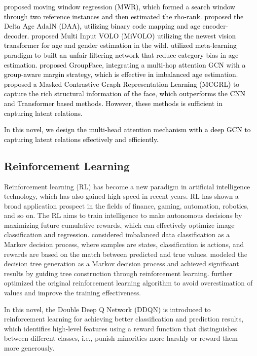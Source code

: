 \textcolor{black}{
\citet{shin2022moving} proposed moving window regression (MWR), which formed a search window through two reference instances and then estimated the rho-rank. \citet{chen2023daa} proposed the Delta Age AdaIN (DAA), utilizing binary code mapping and age encoder-decoder.  \citet{kuprashevich2023mivolo} proposed Multi Input VOLO (MiVOLO) utilizing the newest vision transformer for age and gender estimation in the wild. \citet{wang2023exploiting} utilized meta-learning paradigm to built an unfair filtering network that reduce category bias in age estimation. \citet{zhang2024groupface} proposed GroupFace, integrating a multi-hop attention GCN with a group-aware margin strategy, which is effective in imbalanced age estimation. \citet{shou2025masked} proposed a Masked Contrastive Graph Representation Learning (MCGRL) to capture the rich structural information of the face, which outperforms the CNN and Transformer based methods. However, these methods is sufficient in capturing latent relations.
}

\textcolor{black}{
In this novel, we design the multi-head attention mechanism with a deep GCN to capturing latent relations effectively and efficiently.}



\subsection{Reinforcement Learning}
Reinforcement learning (RL) has become a new paradigm in artificial intelligence technology, which has also gained high speed in recent years. RL has shown a broad application prospect in the fields of finance, gaming, automation, robotics, and so on. The RL aims to train intelligence to make autonomous decisions by maximizing future cumulative rewards, which can effectively optimize image classification and regression. \citet{lin2020deep} considered imbalanced data classification as a Markov decision process, where samples are states, classification is actions, and rewards are based on the match between predicted and true values. \citet{wen2021building} modeled the decision tree generation as a Markov decision process and achieved significant results by guiding tree construction through reinforcement learning. \citet{yang2023deep} further optimized the original reinforcement learning algorithm to avoid overestimation of values and improve the training effectiveness. 

In this novel, the Double Deep Q Network (DDQN) is introduced to reinforcement learning for achieving better classification and prediction results, which identifies high-level features using a reward function that distinguishes between different classes, i.e., punish minorities more harshly or reward them more generously.